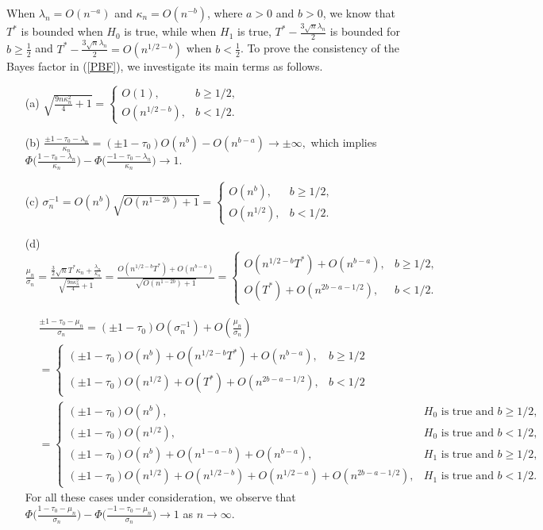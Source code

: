 \documentclass[11pt]{article}
\begin{document}
{When $\lambda_n = O(n^{-a})$ and $\kappa_n = O(n^{-b})$, where $a>0$ and $b>0$, we know that $T^*$ is bounded when $H_0$ is true, while when $H_1$ is true, $T^* - \frac{3\sqrt{n}\lambda_n}{2}$ is bounded for $b\ge\frac{1}{2}$ and $T^* - \frac{3\sqrt{n}\lambda_n}{2} = O(n^{1/2-b})$ when $b<\frac{1}{2}$. To prove the consistency of the Bayes factor in  (\ref{PBF}), we investigate its main terms as follows.
\begin{itemize}
    \item[(a)] $\sqrt{\frac{9n\kappa_n^2}{4}+1} = \begin{cases} O(1),&b\ge 1/2,\\O(n^{1/2-b}),&b<1/2.
    \end{cases}$
    \item[(b)] $\frac{\pm 1-\tau_0-\lambda_n}{\kappa_n} = (\pm 1 -\tau_0)O(n^b) - O(n^{b-a}) \rightarrow \pm\infty,$ which implies $\Phi\bigl(\frac{1-\tau_0-\lambda_n}{\kappa_n}\bigr)-\Phi\bigl(\frac{-1-\tau_0-\lambda_n}{\kappa_n}\bigr)\rightarrow 1$.
    \item[(c)] $\sigma_n^{-1} = O(n^b)\sqrt{O(n^{1-2b})+1} = \begin{cases} O(n^b),&b\ge 1/2,\\O(n^{1/2}),&b<1/2.
    \end{cases}$
    \item[(d)] $\frac{\mu_n}{\sigma_n} = \frac{\frac{3}{2}\sqrt{n}T^*\kappa_n +\frac{\lambda_n}{\kappa_n}}{\sqrt{\frac{9n\kappa_n^2}{4}+1}} = \frac{O(n^{1/2-b}T^*) +O(n^{b-a})}{\sqrt{O( n^{1-2b})+1}} = \begin{cases} O(n^{1/2-b}T^*) +O(n^{b-a}),&b\ge 1/2,\\O(T^*) + O(n^{2b-a-1/2}),&b<1/2.
    \end{cases}$

 \begin{align*}
        &\frac{\pm 1-\tau_0-\mu_n}{\sigma_n} = (\pm 1-\tau_0)O(\sigma_n^{-1}) +O\left(\frac{\mu_n}{\sigma_n}\right) \\&= \begin{cases} (\pm 1-\tau_0)O(n^b) + O(n^{1/2-b}T^*) +O(n^{b-a}),&b\ge 1/2\\(\pm 1-\tau_0)O(n^{1/2}) + O(T^*) + O(n^{2b-a-1/2}),&b<1/2
    \end{cases} \\ &= \begin{cases} (\pm 1-\tau_0)O(n^b),&H_0\text{ is true and }b\ge 1/2,\\(\pm 1-\tau_0)O(n^{1/2}),&H_0\text{ is true and }b<1/2,\\
    (\pm 1-\tau_0)O(n^b) + O(n^{1-a-b}) +O(n^{b-a}),&H_1\text{ is true and }b\ge 1/2,\\
    (\pm 1-\tau_0)O(n^{1/2}) + O(n^{1/2-b}) + O(n^{1/2-a}) + O(n^{2b-a-1/2}),&H_1\text{ is true and }b<1/2.
    \end{cases}
    \end{align*}
    For all these cases under consideration, we observe that $\Phi\bigl(\frac{1-\tau_0-\mu_n}{\sigma_n}\bigr)-\Phi\bigl(\frac{-1-\tau_0-\mu_n}{\sigma_n}\bigr)\rightarrow 1$ as $n\rightarrow\infty.$


\end{itemize}}
\end{document}
